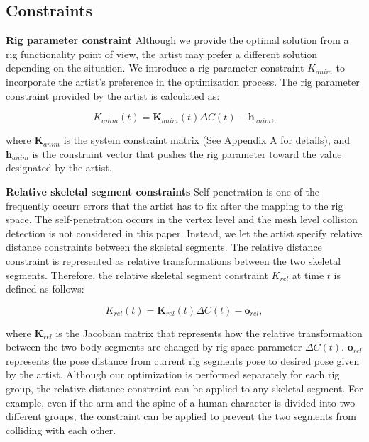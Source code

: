 \subsection{Constraints}

\textbf{Rig parameter constraint}
Although we provide the optimal solution from a rig functionality point of view, the artist may prefer a different solution depending on the situation. We introduce a rig parameter constraint $K_{anim}$ to incorporate the artist's preference in the optimization process. The rig parameter constraint provided by the artist is calculated as:

\begin{equation}
K_{anim} (t) = \mathbf{K}_{anim}(t) \Delta C(t) - \mathbf{h}_{anim},
\end{equation}

where $\mathbf{K}_{anim}$ is the system constraint matrix (See Appendix A for details), and $\mathbf{h}_{anim}$ is the constraint vector that pushes the rig parameter toward the value designated by the artist.

\textbf{Relative skeletal segment constraints}
Self-penetration is one of the frequently occurr errors that the artist has to fix after the mapping to the rig space. The self-penetration occurs in the vertex level and the mesh level collision detection is not considered in this paper. Instead, we let the artist specify relative distance constraints between the skeletal segments. The relative distance constraint is represented as relative transformations between the two skeletal segments. Therefore, the relative skeletal segment constraint $K_{rel}$ at time $t$ is defined as follows:

\begin{equation}
K_{rel} (t) = \mathbf{K}_{rel}(t) \Delta C(t) - \mathbf{o}_{rel},
\end{equation}

where $\mathbf{K}_{rel}$ is the Jacobian matrix that represents how the relative transformation between the two body segments are changed by rig space parameter $\Delta C(t)$. $\mathbf{o}_{rel}$ represents the pose distance from current rig segments pose to desired pose given by the artist. Although our optimization is performed separately for each rig group, the relative distance constraint can be applied to any skeletal segment. For example, even if the arm and the spine of a human character is divided into two different groups, the constraint can be applied to prevent the two segments from colliding with each other.

